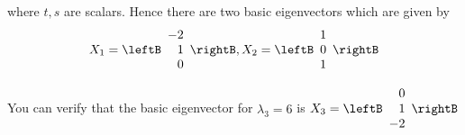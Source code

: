 \begin{solution}
where $t,s$ are scalars. Hence there are two basic eigenvectors which are given by
\begin{equation*}
X_1
=
\leftB
\begin{array}{r}
-2 \\
1 \\
0
\end{array}
\rightB,
X_2
=
\leftB
\begin{array}{r}
1 \\
0 \\
1
\end{array}
\rightB
\end{equation*}

You can verify that the basic eigenvector for $\lambda_3 =6$ is $ X_3 = \leftB
\begin{array}{r}
0 \\
1 \\
-2
\end{array}
\rightB$


\end{solution}
